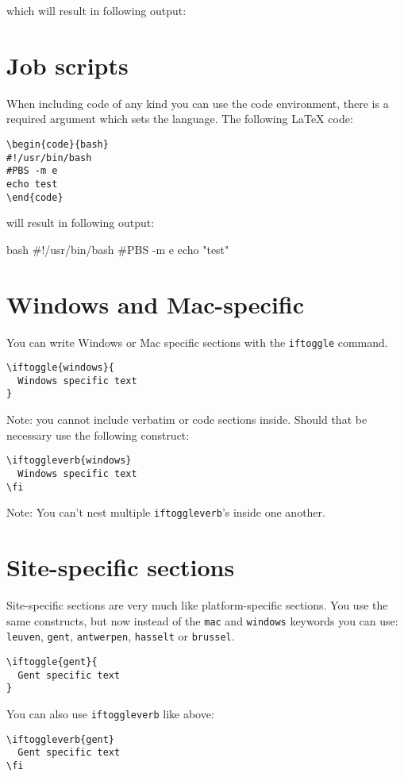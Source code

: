\documentclass[11pt,a4paper]{article}
\begin{document}
which will result in following output:

\section{Job scripts}
\label{sec:job-scripts}

When including code of any kind you can use the code environment, there is a
required argument which sets the language. The following LaTeX code:

\begin{verbatim}
\begin{code}{bash}
#!/usr/bin/bash
#PBS -m e
echo test
\end{code}
\end{verbatim}

will result in following output:

\begin{code}{bash}
#!/usr/bin/bash
#PBS -m e
echo "test"
\end{code}

\section{Windows and Mac-specific}
\label{sec:windows-and-mac-specific}

You can write Windows or Mac specific sections with the \texttt{iftoggle} command.
\begin{verbatim}
\iftoggle{windows}{
  Windows specific text
}
\end{verbatim}

Note: you cannot include verbatim or code sections inside. Should that be necessary use the following construct:

\begin{verbatim}
\iftoggleverb{windows}
  Windows specific text
\fi
\end{verbatim}

Note: You can't nest multiple \texttt{iftoggleverb}'s inside one another.

\section{Site-specific sections}
\label{sec:site-specific-sections}

Site-specific sections are very much like platform-specific sections. You use
the same constructs, but now instead of the \texttt{mac} and \texttt{windows}
keywords you can use: \texttt{leuven}, \texttt{gent}, \texttt{antwerpen},
\texttt{hasselt} or \texttt{brussel}.

\begin{verbatim}
\iftoggle{gent}{
  Gent specific text
}
\end{verbatim}

You can also use \texttt{iftoggleverb} like above:

\begin{verbatim}
\iftoggleverb{gent}
  Gent specific text
\fi
\end{verbatim}
\end{document}
